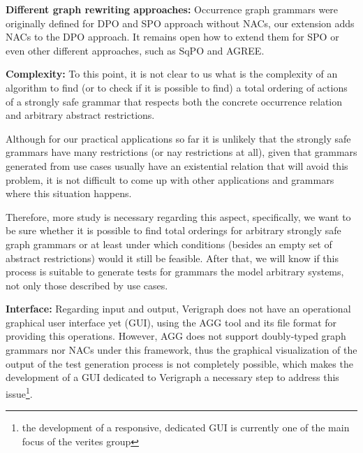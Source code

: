 
\textbf{Different graph rewriting approaches:} Occurrence graph grammars were originally defined for DPO and SPO approach without NACs, our extension adds NACs to the DPO approach. It remains open how to extend them for SPO or even other different approaches, such as SqPO and AGREE.

\textbf{Complexity:} To this point, it is not clear to us what is the complexity of an algorithm to find (or to check if it is possible to find) a total ordering of actions of a strongly safe grammar that respects both the concrete occurrence relation and arbitrary abstract restrictions.

  Although for our practical applications so far it is unlikely that the strongly safe grammars have many restrictions (or nay restrictions at all), given that grammars generated from use cases usually have an existential relation that will avoid this problem, it is not difficult to come up with other applications and grammars where this situation happens.

  Therefore, more study is necessary regarding this aspect, specifically, we want to be sure whether it is possible to find total orderings for arbitrary strongly safe graph grammars or at least under which conditions (besides an empty set of abstract restrictions) would it still be feasible. After that, we will know if this process is suitable to generate tests for grammars the model arbitrary systems, not only those described by use cases.


\textbf{Interface:} Regarding input and output, Verigraph does not have an operational graphical user interface yet (GUI), using the AGG tool and its  file format for providing this operations. However, AGG does not support doubly-typed graph grammars nor NACs under this framework, thus the graphical visualization of the output of the test generation process is not completely possible, which makes the development of a GUI dedicated to Verigraph a necessary step to address this issue\footnote{the development
  of a responsive, dedicated GUI is currently one of the main focus of the verites group}.

